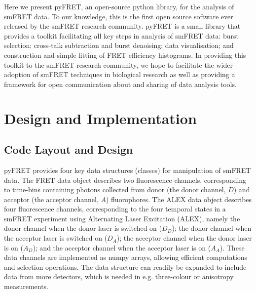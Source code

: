 \documentclass[10pt]{article}
\begin{document}

Here we present pyFRET, an open-source python library, for the analysis of smFRET data. To our knowledge, this is the first open source software ever released by the smFRET research community. pyFRET is a small library that provides a toolkit facilitating all key steps in analysis of smFRET data: burst selection; cross-talk subtraction and burst denoising; data visualisation; and construction and simple fitting of FRET efficiency histograms. In providing this toolkit to the smFRET research community, we hope to facilitate the wider adoption of smFRET techniques in biological research as well as providing a framework for open communication about and sharing of data analysis tools.

\section*{Design and Implementation}
\subsection*{Code Layout and Design}
pyFRET provides four key data structures (classes) for manipulation of smFRET data. The FRET data object describes two fluorescence channels, corresponding to time-bins containing photons collected from donor (the donor channel, $D$) and acceptor (the acceptor channel, $A$) fluorophores. The ALEX data object describes four fluorescence channels, corresponding to the four temporal states in a smFRET experiment using Alternating Laser Excitation (ALEX), namely the donor channel when the donor laser is switched on ($D_D$); the donor channel when the acceptor laser is switched on ($D_A$); the acceptor channel when the donor laser is on ($A_D$); and the acceptor channel when the acceptor laser is on ($A_A$). These data channels are implemented as numpy arrays, allowing efficient computations and selection operations. The data structure can readily be expanded to include data from more detectors, which is needed in e.g. three-colour or anisotropy measurements.
\end{document}
